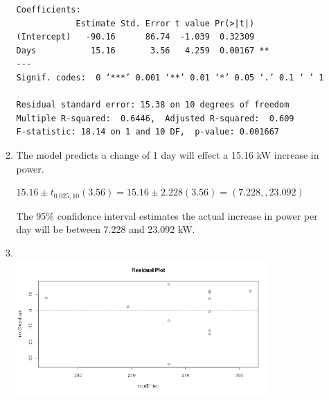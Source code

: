 \documentclass[12pt,letterpaper]{article}
\begin{document}
\begin{enumerate}
\begin{enumerate}
\begin{verbatim}
Coefficients:
            Estimate Std. Error t value Pr(>|t|)   
(Intercept)   -90.16      86.74  -1.039  0.32309   
Days           15.16       3.56   4.259  0.00167 **
---
Signif. codes:  0 ‘***’ 0.001 ‘**’ 0.01 ‘*’ 0.05 ‘.’ 0.1 ‘ ’ 1

Residual standard error: 15.38 on 10 degrees of freedom
Multiple R-squared:  0.6446,  Adjusted R-squared:  0.609 
F-statistic: 18.14 on 1 and 10 DF,  p-value: 0.001667
        \end{verbatim}
      \item The model predicts a change of 1 day will effect a 15.16 kW
        increase in power.

        $15.16 \pm t_{0.025,10}(3.56) = 15.16 \pm 2.228(3.56) = \boxed{(7.228,, 23.092)}$

        The 95\% confidence interval estimates the actual increase in power per
        day will be between 7.228 and 23.092 kW.
      \item \hfill\\
        \includegraphics[width=0.8\textwidth]{3d.png}


\end{enumerate}
\end{enumerate}
\end{document}
